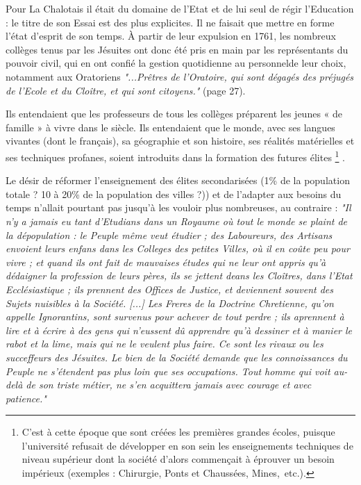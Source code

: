  Pour La Chalotais il était du domaine de l'Etat et de lui seul de régir l'Education : le titre de son Essai est des plus explicites. Il ne faisait que mettre en forme l'état d'esprit de son temps. À partir de leur expulsion en 1761, les nombreux collèges tenus par les Jésuites ont donc été pris en main par les représentants du pouvoir civil, qui en ont confié la gestion quotidienne au personnelde leur choix, notamment aux Oratoriens \emph{"...Prêtres de l'Oratoire, qui sont dégagés des préjugés de l'Ecole et du Cloître, et qui sont citoyens."} (page 27).  
 
 Ils entendaient que les professeurs de tous les collèges préparent les jeunes « de famille » à vivre dans le siècle. Ils entendaient que le monde, avec ses langues vivantes (dont le français), sa géographie et son histoire, ses réalités matérielles et ses techniques profanes, soient introduits dans la formation des futures élites%
\footnote{C'est à cette époque que sont créées les premières grandes écoles, puisque l'université refusait de développer en son sein les enseignements techniques de niveau supérieur dont la société d'alors commençait à éprouver un besoin impérieux (exemples : Chirurgie, Ponts et Chaussées, Mines,~etc.).}%
.


Le désir de réformer l'enseignement des élites secondarisées (1\% de la population totale ? 10 à 20\% de la population des villes ?)) et de l'adapter aux besoins du temps n'allait pourtant pas jusqu'à les vouloir plus nombreuses, au contraire : \emph{"Il n'y a jamais eu tant d'Etudians dans un Royaume où tout le monde se plaint de la dépopulation : le Peuple même veut étudier ; des Laboureurs, des Artisans envoient leurs enfans dans les Colleges des petites Villes, où il en coûte peu pour vivre ; et quand ils ont fait de mauvaises études qui ne leur ont appris qu'à dédaigner la profession de leurs pères, ils se jettent deans les Cloîtres, dans l'Etat Ecclésiastique ; ils prennent des Offices de Justice, et deviennent souvent des Sujets nuisibles à la Société. [...] Les Freres de la Doctrine Chretienne, qu'on appelle Ignorantins, sont survenus pour achever de tout perdre ; ils aprennent à lire et à écrire à des gens qui n'eussent dû apprendre qu'à dessiner et à manier le rabot et la lime, mais qui ne le veulent plus faire. Ce sont les rivaux ou les succeffeurs des Jésuites. Le bien de la Société demande que les connoissances du Peuple ne s'étendent pas plus loin que ses occupations. Tout homme qui voit au-delà de son triste métier, ne s'en acquittera jamais avec courage et avec patience."}


